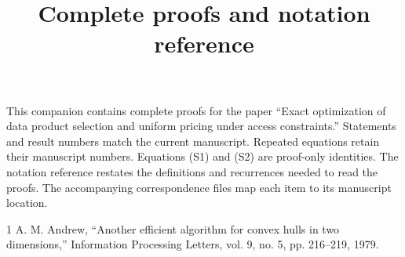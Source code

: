 \documentclass[conference,letterpaper,10pt]{IEEEtran}
\title{Complete proofs and notation reference}
\author{}
\begin{document}
\maketitle
This companion contains complete proofs for the paper ``Exact optimization of data product selection and uniform pricing under access constraints.'' Statements and result numbers match the current manuscript. Repeated equations retain their manuscript numbers. Equations (S1) and (S2) are proof-only identities. The notation reference restates the definitions and recurrences needed to read the proofs. The accompanying correspondence files map each item to its manuscript location.


\begin{thebibliography}{1}
 A. M. Andrew, ``Another efficient algorithm for convex hulls in two dimensions,'' Information Processing Letters, vol. 9, no. 5, pp. 216--219, 1979.
\end{thebibliography}
\end{document}
